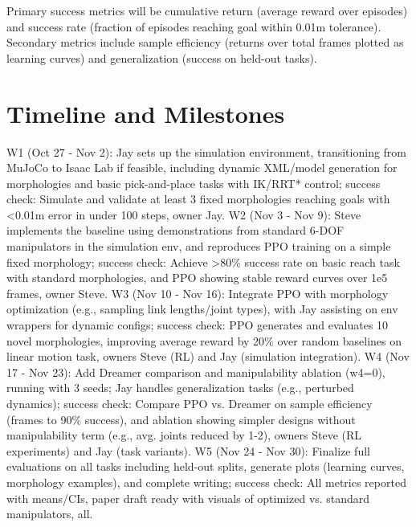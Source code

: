 \documentclass[conference]{IEEEtran}
\begin{document}
Primary success metrics will be cumulative return (average reward over episodes) and success rate (fraction of episodes reaching goal within 0.01m tolerance).
Secondary metrics include sample efficiency (returns over total frames plotted as learning curves) and generalization (success on held-out tasks).

\section{Timeline and Milestones}
W1 (Oct 27 - Nov 2): Jay sets up the simulation environment, transitioning from MuJoCo to Isaac Lab if feasible, including dynamic XML/model generation for morphologies and basic pick-and-place tasks with IK/RRT* control; success check: Simulate and validate at least 3 fixed morphologies reaching goals with <0.01m error in under 100 steps, owner Jay.
W2 (Nov 3 - Nov 9): Steve implements the baseline using demonstrations from standard 6-DOF manipulators in the simulation env, and reproduces PPO training on a simple fixed morphology; success check: Achieve >80\% success rate on basic reach task with standard morphologies, and PPO showing stable reward curves over 1e5 frames, owner Steve.
W3 (Nov 10 - Nov 16): Integrate PPO with morphology optimization (e.g., sampling link lengths/joint types), with Jay assisting on env wrappers for dynamic configs; success check: PPO generates and evaluates 10 novel morphologies, improving average reward by 20\% over random baselines on linear motion task, owners Steve (RL) and Jay (simulation integration).
W4 (Nov 17 - Nov 23): Add Dreamer comparison and manipulability ablation (w4=0), running with 3 seeds; Jay handles generalization tasks (e.g., perturbed dynamics); success check: Compare PPO vs. Dreamer on sample efficiency (frames to 90\% success), and ablation showing simpler designs without manipulability term (e.g., avg. joints reduced by 1-2), owners Steve (RL experiments) and Jay (task variants).
W5 (Nov 24 - Nov 30): Finalize full evaluations on all tasks including held-out splits, generate plots (learning curves, morphology examples), and complete writing; success check: All metrics reported with means/CIs, paper draft ready with visuals of optimized vs. standard manipulators, all.
\end{document}
